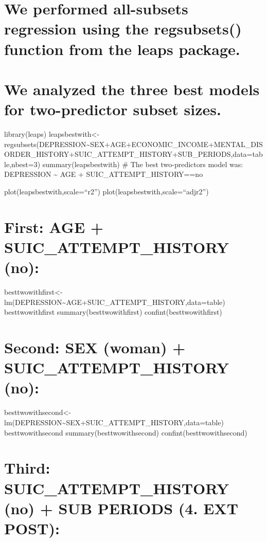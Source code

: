 \documentclass[
]{book}
\begin{document}
\hypertarget{we-performed-all-subsets-regression-using-the-regsubsets-function-from-the-leaps-package.}{%
\chapter{We performed all-subsets regression using the regsubsets() function from the leaps package.}\label{we-performed-all-subsets-regression-using-the-regsubsets-function-from-the-leaps-package.}}

\hypertarget{we-analyzed-the-three-best-models-for-two-predictor-subset-sizes.}{%
\chapter{We analyzed the three best models for two-predictor subset sizes.}\label{we-analyzed-the-three-best-models-for-two-predictor-subset-sizes.}}

library(leaps)
leapsbestwith\textless-regsubsets(DEPRESSION\textasciitilde SEX+AGE+ECONOMIC\_INCOME+MENTAL\_DISORDER\_HISTORY+SUIC\_ATTEMPT\_HISTORY+SUB\_PERIODS,data=table,nbest=3)
summary(leapsbestwith)
\# The best two-predictors model was: DEPRESSION \textasciitilde{} AGE + SUIC\_ATTEMPT\_HISTORY==no

plot(leapsbestwith,scale=``r2'')
plot(leapsbestwith,scale=``adjr2'')

\hypertarget{first-age-suic_attempt_history-no}{%
\chapter{First: AGE + SUIC\_ATTEMPT\_HISTORY (no):}\label{first-age-suic_attempt_history-no}}

besttwowithfirst\textless-lm(DEPRESSION\textasciitilde AGE+SUIC\_ATTEMPT\_HISTORY,data=table)
besttwowithfirst
summary(besttwowithfirst)
confint(besttwowithfirst)

\hypertarget{second-sex-woman-suic_attempt_history-no}{%
\chapter{Second: SEX (woman) + SUIC\_ATTEMPT\_HISTORY (no):}\label{second-sex-woman-suic_attempt_history-no}}

besttwowithsecond\textless-lm(DEPRESSION\textasciitilde SEX+SUIC\_ATTEMPT\_HISTORY,data=table)
besttwowithsecond
summary(besttwowithsecond)
confint(besttwowithsecond)

\hypertarget{third-suic_attempt_history-no-sub-periods-4.-ext-post}{%
\chapter{Third: SUIC\_ATTEMPT\_HISTORY (no) + SUB PERIODS (4. EXT POST):}\label{third-suic_attempt_history-no-sub-periods-4.-ext-post}}
\end{document}

